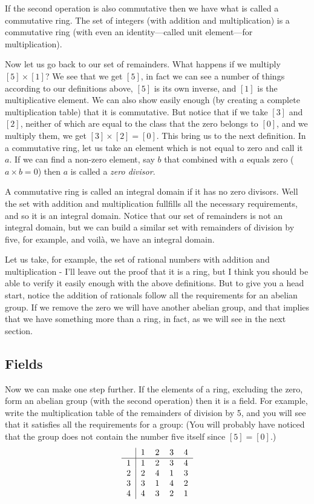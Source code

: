 If the second operation is also commutative then we have what is called
a commutative ring. The set of integers (with addition and
multiplication) is a commutative ring (with even an identity---called
unit element---for multiplication).

Now let us go back to our set of remainders. What happens if we multiply
$[5] \times [1]$? We see that we get $[5]$, in fact we can see a number
of things according to our definitions above, $[5]$ is its own inverse,
and $[1]$ is the multiplicative element. We can also show easily enough
(by creating a complete multiplication table) that it is
commutative. But notice that if we take $[3]$ and $[2]$, neither of
which are equal to the class that the zero belongs to $[0]$, and we
multiply them, we get $[3] \times [2] = [0]$.  This bring us to the next
definition. In a commutative ring, let us take an element which is not
equal to zero and call it $a$. If we can find a non-zero element, say
$b$ that combined with $a$ equals zero ($a \times b = 0$) then $a$ is
called a {\it zero divisor}.

A commutative ring is called an integral domain if it has no zero
divisors.  Well the set \Z{} with addition and multiplication fullfills
all the necessary requirements, and so it is an integral domain. Notice
that our set of remainders is not an integral domain, but we can build a
similar set with remainders of division by five, for example, and
voil\`a, we have an integral domain.

Let us take, for example, the set \Q{} of rational numbers with addition
and multiplication - I'll leave out the proof that it is a ring, but I
think you should be able to verify it easily enough with the above
definitions. But to give you a head start, notice the addition of
rationals follow all the requirements for an abelian group. If we remove
the zero we will have another abelian group, and that implies that we
have something more than a ring, in fact, as we will see in the next
section.

\subsection{Fields}

Now we can make one step further. If the elements of a ring, excluding
the zero, form an abelian group (with the second operation) then it is a
field.  For example, write the multiplication table of the remainders of
division by 5, and you will see that it satisfies all the requirements
for a group: (You will probably have noticed that the group does not
contain the number five itself since $[5] = [0]$.)
\[
\begin{tabular}{  c  |  c  c  c  c  }
    & 1 & 2 & 3 & 4  \\
    \hline
  1 & 1 & 2 & 3 & 4 \\
  2 & 2 & 4 & 1 & 3 \\
  3 & 3 & 1 & 4 & 2 \\
  4 & 4 & 3 & 2 & 1
\end{tabular}
\]

